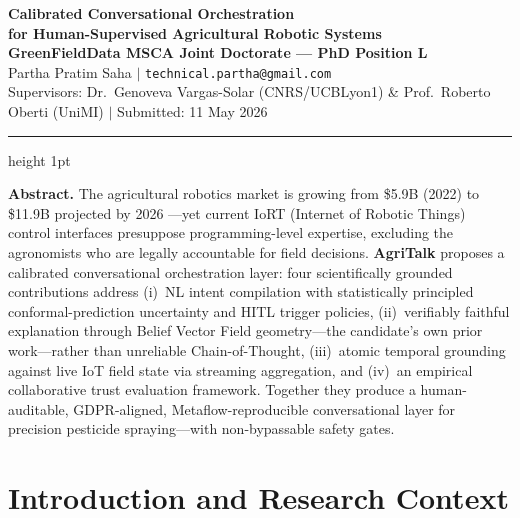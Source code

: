 \documentclass[11pt,a4paper]{article}
\begin{document}
\begin{center}
{\large\bfseries\color{techblue}
  Calibrated Conversational Orchestration\\[2pt]
  for Human-Supervised Agricultural Robotic Systems}\\[4pt]
{\small\bfseries GreenFieldData MSCA Joint Doctorate --- PhD Position L}\\[2pt]
{\small Partha Pratim Saha \;$|$\; \texttt{technical.partha@gmail.com}}\\[1pt]
{\scriptsize Supervisors: Dr.\ Genoveva Vargas-Solar (CNRS/UCBLyon1) \&
Prof.\ Roberto Oberti (UniMI) \;$|$\; Submitted: 11 May 2026}
\end{center}
\vspace{-2pt}\hrule height 1pt\vspace{3pt}

\begin{mdframed}[backgroundcolor=lightgray,linewidth=0.4pt,
  innerleftmargin=7pt,innerrightmargin=7pt,
  innertopmargin=4pt,innerbottommargin=4pt,skipabove=2pt,skipbelow=3pt]
\small\textbf{Abstract.}
The agricultural robotics market is growing from \$5.9B (2022) to \$11.9B projected by 2026 \citep{phd_adv_2026}---yet current IoRT (Internet of Robotic Things) control interfaces presuppose programming-level expertise, excluding the agronomists who are legally accountable for field decisions. \textbf{AgriTalk} proposes a calibrated conversational orchestration layer: four scientifically grounded contributions address (i)~NL intent compilation with statistically principled conformal-prediction uncertainty and HITL trigger policies, (ii)~verifiably faithful explanation through Belief Vector Field geometry---the candidate's own prior work---rather than unreliable Chain-of-Thought, (iii)~atomic temporal grounding against live IoT field state via streaming aggregation, and (iv)~an empirical collaborative trust evaluation framework. Together they produce a human-auditable, GDPR-aligned, Metaflow-reproducible conversational layer for precision pesticide spraying---with non-bypassable safety gates.
\end{mdframed}

\section*{Introduction and Research Context}
\end{document}
